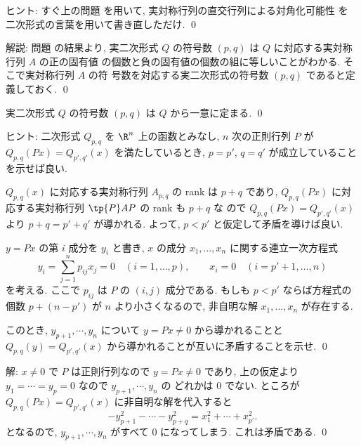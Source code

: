 \documentclass[12pt,twoside]{jarticle}
\newcommand\commentout[1]{#1}
\newcommand\commentout[1]{}
\begin{document}
\noindent
ヒント: すぐ上の問題  を用いて, 
実対称行列の直交行列による対角化可能性  を
二次形式の言葉を用いて書き直しただけ.
\qed

\medskip
\noindent
解説: 問題  の結果より, 
実二次形式 $Q$ の符号数 $(p,q)$ は $Q$ に対応する実対称行列 $A$ の正の固有値
の個数と負の固有値の個数の組に等しいことがわかる.  そこで実対称行列 $A$ の符
号数を対応する実二次形式の符号数 $(p,q)$ であると定義しておく.
\qed


\begin{question}
\label{q:sylvester-3}
  実二次形式 $Q$ の符号数 $(p,q)$ は $Q$ から一意に定まる. \qed
\end{question}

\noindent
ヒント: 二次形式 $Q_{p,q}$ を $\R^n$ 上の函数とみなし, 
$n$ 次の正則行列 $P$ が $Q_{p,q}(Px)=Q_{p',q'}(x)$ を満たしているとき,
$p=p'$, $q=q'$ が成立していることを示せば良い.

$Q_{p,q}(x)$ に対応する実対称行列 $A_{p,q}$ の rank は $p+q$ であり, 
$Q_{p,q}(Px)$ に対応する実対称行列 $\tp{P}AP$ の rank も $p+q$ な
ので $Q_{p,q}(Px)=Q_{p',q'}(x)$ より $p+q=p'+q'$ が導かれる.
よって, $p<p'$ と仮定して矛盾を導けば良い.

$y=Px$ の第 $i$ 成分を $y_i$ と書き, 
$x$ の成分 $x_1,\dots,x_n$ に関する連立一次方程式
\begin{equation*}
  y_i = \sum_{j=1}^n p_{ij} x_j = 0 \quad (i=1,\dots,p),
  \qquad
  x_i = 0 \quad (i=p'+1,\dots,n)
\end{equation*}
を考える.  ここで $p_{ij}$ は $P$ の $(i,j)$ 成分である. 
もしも $p<p'$ ならば方程式の個数 $p+(n-p')$ が $n$ より小さくなるので,
非自明な解 $x_1,\dots,x_n$ が存在する.

このとき, $y_{p+1},\cdots,y_n$ について $y=Px\ne0$ から導かれることと
$Q_{p,q}(y)=Q_{p',q'}(x)$ から導かれることが互いに矛盾することを示せ.
\qed

\commentout{
\medskip
\noindent
解: $x\ne 0$ で $P$ は正則行列なので $y=Px\ne 0$ であり,
上の仮定より $y_1=\cdots=y_p=0$ なので $y_{p+1},\cdots,y_n$ の
どれかは $0$ でない.
ところが $Q_{p,q}(Px)=Q_{p',q'}(x)$ に非自明な解を代入すると
\begin{equation*}
  - y_{p+1}^2 - \cdots - y_{p+q}^2 = x_1^2 + \cdots + x_{p'}^2.
\end{equation*}
となるので, $y_{p+1},\cdots,y_n$ がすべて $0$ になってしまう.
これは矛盾である.
\qed
}
\end{document}
